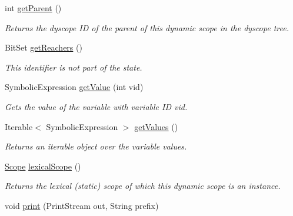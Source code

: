 \begin{DoxyCompactItemize}
\item 
int \hyperlink{classedu_1_1udel_1_1cis_1_1vsl_1_1civl_1_1state_1_1common_1_1immutable_1_1ImmutableDynamicScope_acbdf96e7bca13e91e3a880ad65128282}{get\+Parent} ()
\begin{DoxyCompactList}\small\item\em Returns the dyscope I\+D of the parent of this dynamic scope in the dyscope tree. \end{DoxyCompactList}\item 
Bit\+Set \hyperlink{classedu_1_1udel_1_1cis_1_1vsl_1_1civl_1_1state_1_1common_1_1immutable_1_1ImmutableDynamicScope_a70d5883a470d4749c9f223df96ca00ce}{get\+Reachers} ()
\begin{DoxyCompactList}\small\item\em This identifier is not part of the state. \end{DoxyCompactList}\item 
Symbolic\+Expression \hyperlink{classedu_1_1udel_1_1cis_1_1vsl_1_1civl_1_1state_1_1common_1_1immutable_1_1ImmutableDynamicScope_af957e0a5e8e99f4bd7b3fef61faf0e81}{get\+Value} (int vid)
\begin{DoxyCompactList}\small\item\em Gets the value of the variable with variable I\+D vid. \end{DoxyCompactList}\item 
Iterable$<$ Symbolic\+Expression $>$ \hyperlink{classedu_1_1udel_1_1cis_1_1vsl_1_1civl_1_1state_1_1common_1_1immutable_1_1ImmutableDynamicScope_ad64d64173a8b8b516f24d49ea8f8afea}{get\+Values} ()
\begin{DoxyCompactList}\small\item\em Returns an iterable object over the variable values. \end{DoxyCompactList}\item 
\hyperlink{interfaceedu_1_1udel_1_1cis_1_1vsl_1_1civl_1_1model_1_1IF_1_1Scope}{Scope} \hyperlink{classedu_1_1udel_1_1cis_1_1vsl_1_1civl_1_1state_1_1common_1_1immutable_1_1ImmutableDynamicScope_ab9ba5913c568b43a9678386ba80f9e13}{lexical\+Scope} ()
\begin{DoxyCompactList}\small\item\em Returns the lexical (static) scope of which this dynamic scope is an instance. \end{DoxyCompactList}\item 
void \hyperlink{classedu_1_1udel_1_1cis_1_1vsl_1_1civl_1_1state_1_1common_1_1immutable_1_1ImmutableDynamicScope_a06a2c219222a4a076a4fdf39d7133b04}{print} (Print\+Stream out, String prefix)

\end{DoxyCompactItemize}
